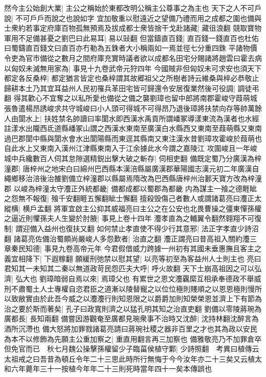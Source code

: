 然今主公始創大業|{
	主公之稱始於東都改明公稱主公尊事之為主也}
天下之人不可戶說|{
	不可戶戶而說之也說如字}
宜加敬重以慰遠近之望備乃禮而用之成都之圍也備與士衆約若事定府庫百物孤無預焉及拔成都士衆皆捨干戈赴諸藏|{
	藏徂浪翻}
競取寶物軍用不足備甚憂之劉巴曰此易耳|{
	易以䜴翻}
但當鑄直百錢|{
	直百錢一錢直百也杜佑曰蜀鑄直百錢文曰直百亦冇勒為五銖者大小稱兩如一焉並徑七分重四銖}
平諸物價令吏為官市備從之數月之間府庫充實時議者欲以成都名田宅分賜諸將趙雲曰霍去病以匈奴未滅無用家為|{
	事見十九卷武帝元狩四年}
今國賊非但匈奴未可求安也須天下都定各反桑梓|{
	都定猶言皆定也桑梓謂其故郷祖父之所樹者詩云維桑與梓必恭敬止}
歸耕本土乃其宜耳益州人民初罹兵革田宅皆可歸還令安居復業然後可役調|{
	調徒弔翻}
得其歡心不宜奪之以私所愛也備從之備之襲劉璋也留中郎將南郡霍峻守葭萌城張魯遣楊昂誘峻求共守城峻曰小人頭可得城不可得昂乃退後璋將扶禁向存等帥萬餘人由閬水上|{
	扶姓禁名帥讀曰率閬水即西漢水禹貢所謂嶓冢導漾東流為漢者也水經註漾水出隴西氐道縣嶓冢山謂之西漢水東南至廣漢白水縣西又東南至葭萌縣又東南過巴郡閬中縣與閬水會水出閬陽縣而東逕其縣南又東注漢水昔劉璋攻霍峻於葭萌也自此水上又東南入漢州江津縣東南入于江余據此水今謂之嘉陵江}
攻圍峻且一年峻城中兵纔數百人伺其怠隙選精鋭出擊大破之斬存|{
	伺相吏翻}
備既定蜀乃分廣漢為梓潼郡|{
	唐梓州之地宋白曰綿州巴西縣本漢涪縣屬廣漢郡華陽國志漢元初二年廣漢自繩鄉移治涪後治雒劉備立梓潼郡以縣屬焉隋改為巴西縣唐梓州治郪天寶方改為梓潼郡}
以峻為梓潼太守灋正外統都畿|{
	備都成都以蜀郡為都畿}
内為謀主一飱之德睚眦之怨無不報復|{
	飱千安翻睚五懈翻眦士懈翻}
擅殺毁傷己者數人或謂諸葛亮曰灋正太縱横|{
	横戶孟翻}
將軍宜啟主公抑其威福亮曰主公之在公安也北畏曹操之彊東憚孫權之逼近則懼孫夫人生變於肘腋|{
	事見上卷十四年}
灋孝直為之輔翼令翻然翱翔不可復制|{
	謂迎備入益州也復扶又翻}
如何禁止孝直使不得少行其意邪|{
	法正字孝直少詩沼翻}
諸葛亮佐備治蜀頗尚嚴峻人多怨歎者|{
	治直之翻}
灋正謂亮曰昔高祖入關約灋三章秦民知德|{
	事見九卷高帝元年}
今君假借威力跨據一州初有其國未垂惠撫且客主之義宜相降下|{
	下遐稼翻}
願緩刑弛禁以慰其望|{
	以亮等初至為客益州人士則主也}
亮曰君知其一未知其二秦以無道政苛民怨匹夫大呼|{
	呼火故翻}
天下土崩高祖因之可以弘濟|{
	弘大也}
劉璋暗弱自焉以來|{
	焉璋父也}
有累世之恩文灋覊縻互相承奉德政不舉威刑不肅蜀土人士專權自恣君臣之道漸以陵替寵之以位位極則賤順之以恩恩極則慢所以致敝實由於此吾今威之以灋灋行則知恩限之以爵爵加則知榮榮恩並濟上下有節為治之要於斯而著矣|{
	孔子曰政寬則濟之以猛孔明其知之治直吏翻}
劉備以零陵蔣琬為廣都長|{
	長知兩翻}
備嘗因游觀奄至廣都見琬衆事不治時又沈醉|{
	沈持林翻沈醉言為酒所沉滯也}
備大怒將加罪戮諸葛亮請曰蔣琬社稷之器非百里之才也其為政以安民為本不以修飾為先願主公重加察之|{
	重直用翻言再三加察也}
備雅敬亮乃不加罪倉卒但免官而已　秋七月魏公操擊孫權留少子臨菑侯植守鄴|{
	少詩照翻　考異曰植傳云太祖戒之曰吾昔為頓丘令年二十三思此時所行無悔于今今汝年亦二十三矣又云植太和六年薨年三十一按植今年年二十三則死時當年四十一矣本傳誤也}
